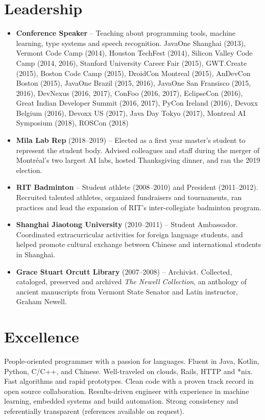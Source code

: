 \documentclass[letterpaper,11pt]{article}
\newcommand{\resumeItem}[2]{
\item\small{
\textbf{#1}{ #2 \vspace{-2pt}}
}
}
\newcommand{\resumeSubItem}[2]{\resumeItem{#1}{#2}\vspace{-4pt}}
\newcommand{\resumeSubHeadingListStart}{\begin{itemize}[leftmargin=*]}
\newcommand{\resumeSubHeadingListEnd}{\end{itemize}}
\begin{document}
\begin{justify}
\section{Leadership}
\resumeSubHeadingListStart
\resumeSubItem{Conference Speaker} {-- Teaching about programming tools, machine learning, type systems and speech recognition. JavaOne Shanghai (2013), Vermont Code Camp (2014), Houston TechFest (2014), Silicon Valley Code Camp (2014, 2016), Stanford University Career Fair (2015), GWT.Create (2015), Boston Code Camp (2015), DroidCon Montreal (2015), AnDevCon Boston (2015), JavaOne Brazil (2015, 2016), JavaOne San Fransisco (2015, 2016), DevNexus (2016, 2017), ConFoo (2016, 2017), EclipseCon (2016), Great Indian Developer Summit (2016, 2017), PyCon Ireland (2016), Devoxx Belgium (2016), Devoxx US (2017), Java Day Tokyo (2017), Montreal AI Symposium (2018), ROSCon (2018)}
\resumeSubItem{Mila Lab Rep} {(2018--2019) -- Elected as a first year master's student to represent the student body. Advised colleagues and staff during the merger of Montr\'eal's two largest AI labs, hosted Thanksgiving dinner, and ran the 2019 election.}
\resumeSubItem{RIT Badminton} {-- Student athlete (2008--2010) and President (2011--2012). Recruited talented athletes, organized fundraisers and tournaments, ran practices and lead the expansion of RIT's inter-collegiate badminton program.}
\resumeSubItem{Shanghai Jiaotong University} {(2010--2011) -- Student Ambassador. Coordinated extracurricular activities for foreign language students, and helped promote cultural exchange between Chinese and international students in Shanghai.}
\resumeSubItem{Grace Stuart Orcutt Library} {(2007--2008) -- Archivist. Collected, cataloged, preserved and archived \textit{The Newell Collection}, an anthology of ancient manuscripts from Vermont State Senator and Latin instructor, Graham Newell.}
\resumeSubHeadingListEnd

\section{Excellence}
People-oriented programmer with a passion for languages. Fluent in Java, Kotlin, Python, C/C++, and Chinese. Well-traveled on clouds, Rails, HTTP and *nix. Fast algorithms and rapid prototypes. Clean code with a proven track record in open source collaboration. Results-driven engineer with experience in machine learning, embedded systems and build automation. Strong consistency and referentially transparent (references available on request).
\end{justify}
\end{document}
